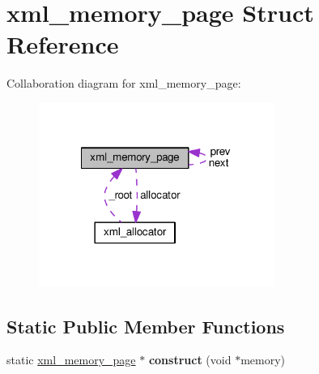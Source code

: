 \hypertarget{structxml__memory__page}{\section{xml\+\_\+memory\+\_\+page Struct Reference}
\label{structxml__memory__page}
}


Collaboration diagram for xml\+\_\+memory\+\_\+page\+:
\nopagebreak
\begin{figure}[H]
\begin{center}
\leavevmode
\includegraphics[width=218pt]{structxml__memory__page__coll__graph}
\end{center}
\end{figure}
\subsection*{Static Public Member Functions}
\begin{DoxyCompactItemize}
\item 
\hypertarget{structxml__memory__page_ab425973f2abb4fa98ff077d88c0df11c}{static \hyperlink{structxml__memory__page}{xml\+\_\+memory\+\_\+page} $\ast$ {\bfseries construct} (void $\ast$memory)}\label{structxml__memory__page_ab425973f2abb4fa98ff077d88c0df11c}

\end{DoxyCompactItemize}
